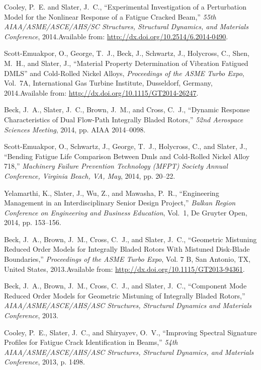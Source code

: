 Cooley, P.~E. and Slater, J.~C., ``Experimental Investigation of a  Perturbation Model for the Nonlinear Response of a Fatigue Cracked Beam,''  \emph{ 55th AIAA/ASME/ASCE/AHS/SC Structures, Structural Dynamics, and  Materials Conference\/}, 2014.\newblock Available from: \url{http://dx.doi.org/10.2514/6.2014-0490}.

Scott-Emuakpor, O., George, T.~J., Beck, J., Schwartz, J., Holycross, C., Shen,  M.~H., and Slater, J., ``Material Property Determination of Vibration  Fatigued {DMLS'' and Cold-Rolled Nickel Alloys,} \emph{ Proceedings of the ASME  Turbo Expo\/}, Vol.~7A, International Gas Turbine Institute, Dusseldorf,  Germany, 2014.\newblock Available from: \url{http://dx.doi.org/10.1115/GT2014-26247}.

Beck, J.~A., Slater, J.~C., Brown, J.~M., and Cross, C.~J., ``Dynamic  Response Characteristics of Dual Flow-Path Integrally Bladed Rotors,'' \emph{  52nd Aerospace Sciences Meeting\/}, 2014, pp. AIAA 2014--0098.

Scott-Emuakpor, O., Schwartz, J., George, T.~J., Holycross, C., and Slater, J.,  ``Bending Fatigue Life Comparison Between Dmls and Cold-Rolled Nickel  Alloy 718,'' \emph{ Machinery Failure Prevention Technology (MFPT) Society  Annual Conference, Virginia Beach, VA, May\/}, 2014, pp. 20--22.

Yelamarthi, K., Slater, J., Wu, Z., and Mawasha, P.~R., ``Engineering  Management in an Interdisciplinary Senior Design Project,'' \emph{ Balkan Region  Conference on Engineering and Business Education\/}, Vol.~1, De Gruyter Open,  2014, pp. 153--156.

Beck, J.~A., Brown, J.~M., Cross, C.~J., and Slater, J.~C., ``Geometric  Mistuning Reduced Order Models for Integrally Bladed Rotors With Mistuned  Disk-Blade Boundaries,'' \emph{ Proceedings of the ASME Turbo Expo\/}, Vol. 7 B,  {San Antonio, TX, United States}, 2013.\newblock Available from: \url{http://dx.doi.org/10.1115/GT2013-94361}.

Beck, J.~A., Brown, J.~M., Cross, C.~J., and Slater, J.~C., ``Component  Mode Reduced Order Models for Geometric Mistuning of Integrally Bladed  Rotors,'' \emph{  AIAA/\linebreak[1]ASME/\linebreak[1]ASCE/\linebreak[1]AHS/\linebreak[1]ASC  Structures, Structural Dynamics and Materials Conference\/}, 2013.

Cooley, P.~E., Slater, J.~C., and Shiryayev, O.~V., ``Improving Spectral  Signature Profiles for Fatigue Crack Identification in Beams,'' \emph{ 54th  AIAA/ASME/ASCE/AHS/ASC Structures, Structural Dynamics, and Materials  Conference\/}, 2013, p. 1498.


